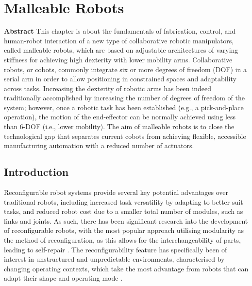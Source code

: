\setcounter{chapter}{6}
\setcounter{page}{168}
\chapter[Malleable Robots]{Malleable Robots}\label{chMalleableRobots}

\textbf{Abstract } This chapter is about the fundamentals of fabrication, control, and human-robot interaction of a new type of collaborative robotic manipulators, called malleable robots, which are based on adjustable architectures of varying stiffness for achieving high dexterity with lower mobility arms. Collaborative robots, or cobots, commonly integrate six or more degrees of freedom (DOF) in a serial arm in order to allow positioning in constrained spaces and adaptability across tasks. Increasing the dexterity of robotic arms has been indeed traditionally accomplished by increasing the number of degrees of freedom of the system; however, once a robotic task has been established (e.g., a pick-and-place operation), the motion of the end-effector can be normally achieved using less than 6-DOF (i.e., lower mobility). The aim of malleable robots is to close the technological gap that separates current cobots from achieving flexible, accessible manufacturing automation with a reduced number of actuators.

\section{Introduction}\label{secIntro}
Reconfigurable robot systems provide several key potential advantages over traditional robots, including increased task versatility by adapting to better suit tasks, and reduced robot cost due to a smaller total number of modules, such as links and joints. As such, there has been significant research into the development of reconfigurable robots, with the most popular approach utilising modularity as the method of reconfiguration, as this allows for the interchangeability of parts, leading to self-repair \cite{yim2007modular, seo2019modular}. The reconfigurability feature has specifically been of interest in unstructured and unpredictable environments, characterised by changing operating contexts, which take the most advantage from robots that can adapt their shape and operating mode \cite{valente2016reconfigurable}.


